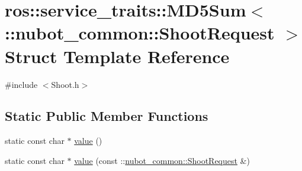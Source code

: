 \hypertarget{structros_1_1service__traits_1_1MD5Sum_3_01_1_1nubot__common_1_1ShootRequest_01_4}{\section{ros\-:\-:service\-\_\-traits\-:\-:M\-D5\-Sum$<$ \-:\-:nubot\-\_\-common\-:\-:Shoot\-Request $>$ Struct Template Reference}
\label{structros_1_1service__traits_1_1MD5Sum_3_01_1_1nubot__common_1_1ShootRequest_01_4}
}


{\ttfamily \#include $<$Shoot.\-h$>$}

\subsection*{Static Public Member Functions}
\begin{DoxyCompactItemize}
\item 
static const char $\ast$ \hyperlink{structros_1_1service__traits_1_1MD5Sum_3_01_1_1nubot__common_1_1ShootRequest_01_4_a06c6b5ff429e4791f4fbe12908a12e88}{value} ()
\item 
static const char $\ast$ \hyperlink{structros_1_1service__traits_1_1MD5Sum_3_01_1_1nubot__common_1_1ShootRequest_01_4_ab1a6399878f5101cfb0d8bf3cd716a8e}{value} (const \-::\hyperlink{namespacenubot__common_ae80d20ffb44fb7b8c15ae5efb75aed2a}{nubot\-\_\-common\-::\-Shoot\-Request} \&)
\end{DoxyCompactItemize}


